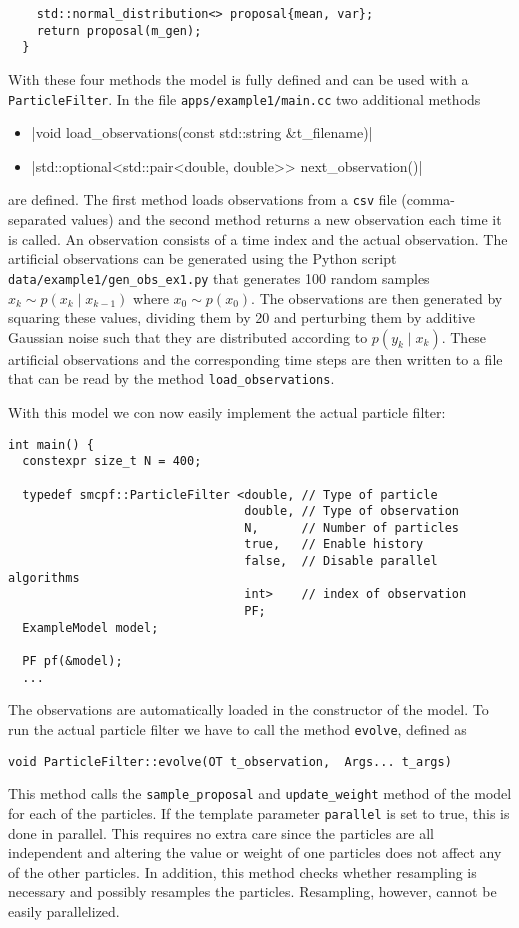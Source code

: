 \begin{example}
\begin{verbatim}
    std::normal_distribution<> proposal{mean, var};
    return proposal(m_gen);
  }
\end{verbatim}
  With these four methods the model is fully defined and can be used
  with a \texttt{ParticleFilter}. In the file
  \texttt{apps/example1/main.cc} two additional methods
  \begin{itemize}
  \item {}|void load_observations(const std::string
    &t_filename)|
  \item {}|std::optional<std::pair<double, double>>
    next_observation()|
  \end{itemize}
  are defined. The first method loads observations from a \texttt{csv}
  file (comma-separated values) and the second method returns a new
  observation each time it is called. An observation consists of a
  time index and the actual observation. The artificial observations
  can be generated using the Python script
  \texttt{data/example1/gen\_obs\_ex1.py} that generates 100 random
  samples $x_k \sim p(x_k \mid x_{k-1})$ where $x_0 \sim p(x_0)$. The
  observations are then generated by squaring these values, dividing
  them by 20 and perturbing them by additive Gaussian noise such that
  they are distributed according to $p(y_k \mid x_k)$. These
  artificial observations and the corresponding time steps are then
  written to a file that can be read by the method
  \texttt{load\_observations}.

  With this model we con now easily implement the actual particle
  filter:
\begin{verbatim}
int main() {
  constexpr size_t N = 400;

  typedef smcpf::ParticleFilter <double, // Type of particle
                                 double, // Type of observation
                                 N,      // Number of particles
                                 true,   // Enable history
                                 false,  // Disable parallel algorithms
                                 int>    // index of observation
                                 PF;
  ExampleModel model;

  PF pf(&model);
  ...
\end{verbatim}
  The observations are automatically loaded in the constructor of the
  model. To run the actual particle filter we have to call the method
  \texttt{evolve}, defined as
\begin{verbatim}
void ParticleFilter::evolve(OT t_observation,  Args... t_args)
\end{verbatim}
  This method calls the \texttt{sample\_proposal} and
  \texttt{update\_weight} method of the model for each of the
  particles. If the template parameter \texttt{parallel} is set to
  true, this is done in parallel. This requires no extra care since
  the particles are all independent and altering the value or weight
  of one particles does not affect any of the other particles.  In
  addition, this method checks whether resampling is necessary and
  possibly resamples the particles. Resampling, however, cannot be
  easily parallelized.


\end{example}
